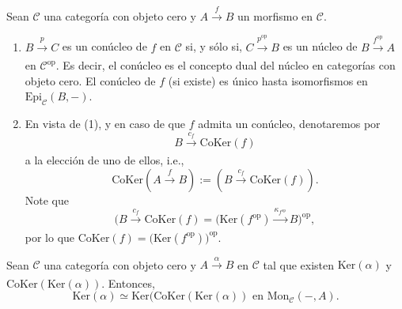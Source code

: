 \documentclass[tesis]{subfiles}
\begin{document}
\begin{Obs} \label{Dualidad de núcleo y conúcleo}

    Sean $\mathscr{C}$ una categoría con objeto cero y $A\xrightarrow{f} B$ un morfismo en $\mathscr{C}$.
    \begin{enumerate}[label=(\arabic*)]
    

        \item $B\xrightarrow{p} C$ es un conúcleo de $f$ en $\mathscr{C}$ si, y sólo si, $C\xrightarrow[]{p^{\text{op}}} B$ es un núcleo de $B\xrightarrow[]{f^{\text{op}}} A$ en $\mathscr{C}^{\text{op}}$. Es decir, el conúcleo es el concepto dual del núcleo en categorías con objeto cero. El conúcleo de $f$ (si existe) es único hasta isomorfismos en $\text{Epi}_\mathscr{C}(B,-)$. 

        \item En vista de (1), y en caso de que $f$ admita un conúcleo, denotaremos por
            \[
                B\xrightarrow[]{c_f} \text{CoKer}(f)
            \]
            a la elección de uno de ellos, i.e.,
            \[
                \text{CoKer}(A\xrightarrow[]{f}B) := (B\xrightarrow[]{c_f}\text{CoKer}(f)).
            \] 
            Note que
            \[
                (B\xrightarrow[]{c_f}\text{CoKer}(f) = \big(\text{Ker}(f^{\text{op}})\xrightarrow[]{\kappa_{f^{\text{op}}}} B\big)^{\text{op}},
            \] 
            por lo que $\text{CoKer}(f) = \big(\text{Ker}(f^{\text{op}})\big)^{\text{op}}$.
    \end{enumerate}
\end{Obs}

\begin{Prop}\label{Mendoza-1.5.8}
    Sean $\mathscr{C}$ una categoría con objeto cero y $A\xrightarrow[]{\alpha}B$ en $\mathscr{C}$ tal que existen $\text{Ker}(\alpha)$ y $\text{CoKer}(\text{Ker}(\alpha))$. Entonces,
    \[
    \text{Ker}(\alpha) \simeq \text{Ker}(\text{CoKer}(\text{Ker}(\alpha)) \text{ en } \text{Mon}_\mathscr{C}(-,A).
    \] 
\end{Prop}
\end{document}
